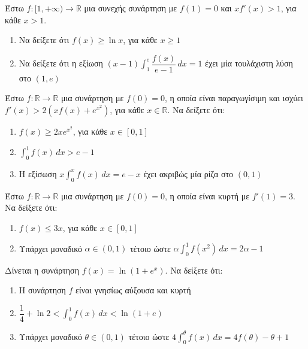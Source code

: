 \documentclass{presentation}
\begin{document}
\begin{askisi}
  Έστω $f:[1,+\infty)\to \mathbb{R}$ μια συνεχής συνάρτηση με $f(1)=0$ και $xf'(x)>1$, για κάθε $x>1$.
  \begin{enumerate}[<+->]
    \item Να δείξετε ότι $f(x)\ge \ln x$, για κάθε $x\ge 1$
    \item Να δείξετε ότι η εξίωση $(x-1)\int_{1}^{e}\dfrac{f(x)}{e-1}\, dx=1$ έχει μία τουλάχιστη λύση στο $(1,e)$
  \end{enumerate}
\end{askisi}

\begin{askisi}
  Έστω $f:\mathbb{R}\to \mathbb{R}$ μια συνάρτηση με $f(0)=0$, η οποία είναι παραγωγίσιμη και ισχύει $f'(x)>2 \left( xf(x)+e^{x^2} \right)$, για κάθε $x\in \mathbb{R}$. Να δείξετε ότι:
  \begin{enumerate}[<+->]
    \item $f(x)\ge 2xe^{x^2}$, για κάθε $x\in [0,1]$
    \item $\int_{0}^{1}f(x)\, dx>e-1$
    \item Η εξίσωση $x\int_{0}^{x}f(x)\, dx=e-x$ έχει ακριβώς μία ρίζα στο $(0,1)$
  \end{enumerate}
\end{askisi}

\begin{askisi}
  Έστω $f:\mathbb{R}\to \mathbb{R}$ μια συνάρτηση με $f(0)=0$, η οποία είναι κυρτή με $f'(1)=3$. Να δείξετε ότι:
  \begin{enumerate}[<+->]
    \item $f(x)\le 3x$, για κάθε $x\in [0,1]$
    \item Υπάρχει μοναδικό $α\in (0,1)$ τέτοιο ώστε $α\int_{0}^{1}f(x^2)\, dx=2α-1$
  \end{enumerate}
\end{askisi}

\begin{askisi}
  Δίνεται η συνάρτηση $f(x)=\ln (1+e^x)$. Να δείξετε ότι:
  \begin{enumerate}[<+->]
    \item Η συνάρτηση $f$ είναι γνησίως αύξουσα και κυρτή
    \item $\dfrac{1}{4}+\ln 2<\int_{0}^{1}f(x)\, dx<\ln (1+e)$
    \item Υπάρχει μοναδικό $θ\in (0,1)$ τέτοιο ώστε $4\int_{0}^{θ}f(x)\, dx=4f(θ)-θ+1$
  \end{enumerate}
\end{askisi}

\moodle
\end{document}
